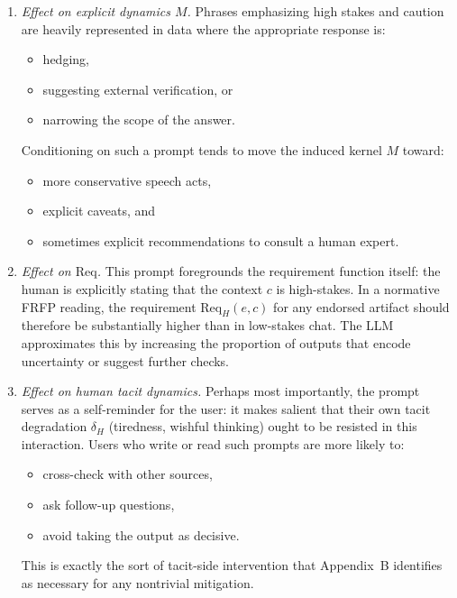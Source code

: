 \begin{enumerate}
  \item \emph{Effect on explicit dynamics $M$.} Phrases emphasizing high
    stakes and caution are heavily represented in data where the appropriate
    response is:
    \begin{itemize}
      \item hedging,
      \item suggesting external verification, or
      \item narrowing the scope of the answer.
    \end{itemize}
    Conditioning on such a prompt tends to move the induced kernel $M$
    toward:
    \begin{itemize}
      \item more conservative speech acts,
      \item explicit caveats, and
      \item sometimes explicit recommendations to consult a human expert.
    \end{itemize}

  \item \emph{Effect on $\mathrm{Req}$.} This prompt foregrounds the
    requirement function itself: the human is explicitly stating that the
    context $c$ is high-stakes. In a normative FRFP reading, the
    requirement $\mathrm{Req}_H(e,c)$ for any endorsed artifact should
    therefore be substantially higher than in low-stakes chat. The LLM
    approximates this by increasing the proportion of outputs that encode
    uncertainty or suggest further checks.

  \item \emph{Effect on human tacit dynamics.} Perhaps most importantly,
    the prompt serves as a self-reminder for the user: it makes salient
    that their own tacit degradation $\delta_H$ (tiredness, wishful
    thinking) ought to be resisted in this interaction. Users who write
    or read such prompts are more likely to:
    \begin{itemize}
      \item cross-check with other sources,
      \item ask follow-up questions,
      \item avoid taking the output as decisive.
    \end{itemize}
    This is exactly the sort of tacit-side intervention that Appendix~B
    identifies as necessary for any nontrivial mitigation.
\end{enumerate}

